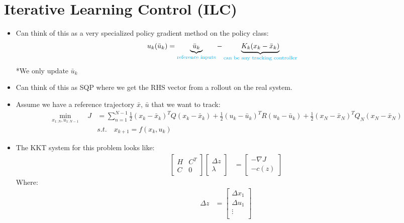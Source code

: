 \documentclass[11pt]{article}
\begin{document}
\section*{Iterative Learning Control (ILC)} 
\begin{itemize}
    \item Can think of this as a very specialized policy gradient method on the policy class:
    \begin{align*}
        u_k(\bar{u}_k) &= \underbrace{\bar{u}_k}_{\textcolor{cyan}{\text{reference inputs}}} - \underbrace{K_k(x_k-\bar{x}_k)}_{\textcolor{cyan}{\text{can be any tracking controller}}}
    \end{align*}
    *We only update $\bar{u}_k$
    \item Can think of this as SQP where we get the RHS vector from a rollout on the real system.
    \item Assume we have a reference trajectory $\bar{x}$, $\bar{u}$ that we want to track:
    \begin{align*}
        \min_{x_{1:N},u_{1:N-1}} \quad J &= \sum_{n=1}^{N-1}\frac{1}{2}(x_k-\bar{x}_k)^TQ(x_k-\bar{x}_k) + \frac{1}{2}(u_k-\bar{u}_k)^TR(u_k-\bar{u}_k) + \frac{1}{2}(x_N - \bar{x}_N)^TQ_N(x_N-\bar{x}_N)
        \\
        & s.t. \quad x_{k+1} = f(x_k,u_k)
    \end{align*}
    \item The KKT system for this problem looks like:
    \begin{align*}
        \begin{bmatrix}
            H & C^T \\
            C & 0
        \end{bmatrix}
        \begin{bmatrix}
            \Delta z \\
            \lambda
        \end{bmatrix}
        &=
        \begin{bmatrix}
            -\nabla J \\
            -c(z)
        \end{bmatrix}
    \end{align*}
    Where:
    \begin{align*}
        \Delta z &=
        \begin{bmatrix}
            \Delta x_1 \\
            \Delta u_1 \\
            \vdots \\

\end{bmatrix}
\end{align*}
\end{itemize}
\end{document}
